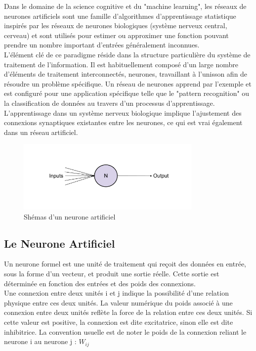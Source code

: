 Dans le domaine de la science cognitive et du "machine learning", les réseaux de neurones artificiels sont une famille d'algorithmes d'apprentissage statistique inspirés par les réseaux de neurones biologiques (système nerveux central, cerveau) et sont utilisés pour estimer ou approximer une fonction pouvant prendre un nombre important d'entrées généralement inconnues.\\

L'élément clé de ce paradigme réside dans la structure particulière du système de traitement de l'information. Il est habituellement composé d'un large nombre d'éléments de traitement interconnectés, neurones, travaillant à l’unisson afin de résoudre un problème spécifique. Un réseau de neurones apprend par l'exemple et est configuré pour une application spécifique telle que le "pattern recognition" ou la classification de données au travers d'un processus d’apprentissage. L'apprentissage dans un système nerveux biologique implique l'ajustement des connexions synaptiques existantes entre les neurones, ce qui est vrai également dans un réseau artificiel.

   
\begin{figure}[H]
    \centering
    \includegraphics[width=0.8\textwidth]{./pictures/neurone.png}
    \caption{Shémas d'un neurone artificiel}
\end{figure}

\subsection{Le Neurone Artificiel}
Un neurone formel est une unité de traitement qui reçoit des données en entrée, sous la forme d’un vecteur, et produit une sortie réelle. Cette sortie est déterminée en fonction des entrées et des poids des connexions.\\
Une connexion entre deux unités i et j indique la possibilité d'une relation physique entre ces deux unités.
La valeur numérique du poids associé à une connexion entre deux unités reflète la force de la relation entre ces deux unités. Si cette valeur est positive, la connexion est dite excitatrice, sinon elle est dite inhibitrice. La convention usuelle est de noter le poids de la connexion reliant le neurone
i au neurone j : $W_{ij}$

